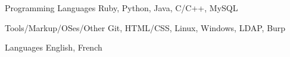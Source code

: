 

\begin{cvskills}

  \cvskill
    {Programming Languages} %
    {Ruby, Python, Java, C/C++, MySQL} %

  \cvskill
    {Tools/Markup/OSes/Other} %
    {Git, HTML/CSS, Linux, Windows, LDAP, Burp} %

  \cvskill
    {Languages} %
    {English, French} %

\end{cvskills}